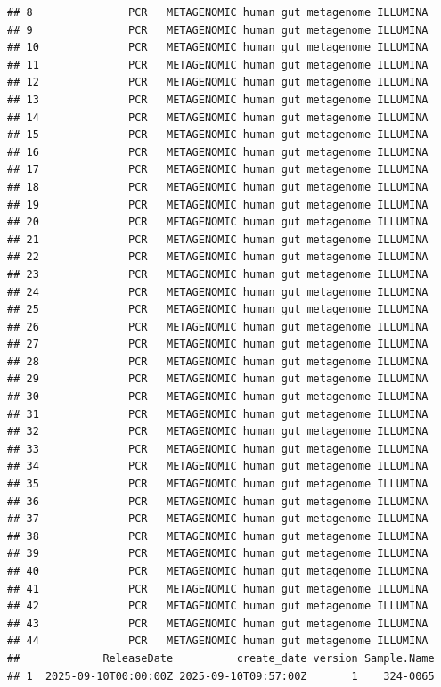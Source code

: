 \documentclass[
]{article}
\begin{document}
\begin{verbatim}
## 8               PCR   METAGENOMIC human gut metagenome ILLUMINA
## 9               PCR   METAGENOMIC human gut metagenome ILLUMINA
## 10              PCR   METAGENOMIC human gut metagenome ILLUMINA
## 11              PCR   METAGENOMIC human gut metagenome ILLUMINA
## 12              PCR   METAGENOMIC human gut metagenome ILLUMINA
## 13              PCR   METAGENOMIC human gut metagenome ILLUMINA
## 14              PCR   METAGENOMIC human gut metagenome ILLUMINA
## 15              PCR   METAGENOMIC human gut metagenome ILLUMINA
## 16              PCR   METAGENOMIC human gut metagenome ILLUMINA
## 17              PCR   METAGENOMIC human gut metagenome ILLUMINA
## 18              PCR   METAGENOMIC human gut metagenome ILLUMINA
## 19              PCR   METAGENOMIC human gut metagenome ILLUMINA
## 20              PCR   METAGENOMIC human gut metagenome ILLUMINA
## 21              PCR   METAGENOMIC human gut metagenome ILLUMINA
## 22              PCR   METAGENOMIC human gut metagenome ILLUMINA
## 23              PCR   METAGENOMIC human gut metagenome ILLUMINA
## 24              PCR   METAGENOMIC human gut metagenome ILLUMINA
## 25              PCR   METAGENOMIC human gut metagenome ILLUMINA
## 26              PCR   METAGENOMIC human gut metagenome ILLUMINA
## 27              PCR   METAGENOMIC human gut metagenome ILLUMINA
## 28              PCR   METAGENOMIC human gut metagenome ILLUMINA
## 29              PCR   METAGENOMIC human gut metagenome ILLUMINA
## 30              PCR   METAGENOMIC human gut metagenome ILLUMINA
## 31              PCR   METAGENOMIC human gut metagenome ILLUMINA
## 32              PCR   METAGENOMIC human gut metagenome ILLUMINA
## 33              PCR   METAGENOMIC human gut metagenome ILLUMINA
## 34              PCR   METAGENOMIC human gut metagenome ILLUMINA
## 35              PCR   METAGENOMIC human gut metagenome ILLUMINA
## 36              PCR   METAGENOMIC human gut metagenome ILLUMINA
## 37              PCR   METAGENOMIC human gut metagenome ILLUMINA
## 38              PCR   METAGENOMIC human gut metagenome ILLUMINA
## 39              PCR   METAGENOMIC human gut metagenome ILLUMINA
## 40              PCR   METAGENOMIC human gut metagenome ILLUMINA
## 41              PCR   METAGENOMIC human gut metagenome ILLUMINA
## 42              PCR   METAGENOMIC human gut metagenome ILLUMINA
## 43              PCR   METAGENOMIC human gut metagenome ILLUMINA
## 44              PCR   METAGENOMIC human gut metagenome ILLUMINA
##             ReleaseDate          create_date version Sample.Name
## 1  2025-09-10T00:00:00Z 2025-09-10T09:57:00Z       1    324-0065

\end{verbatim}
\end{document}
